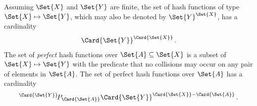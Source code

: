 \documentclass[ ../main.tex]{subfiles}
\begin{document}
Assuming $\Set{X}$ and $\Set{Y}$ are finite, the set of hash functions of type $\Set{X} \mapsto \Set{Y}$, which may also be denoted by $\Set{Y}^{\Set{X}}$, has a cardinality
\begin{equation}
\Card{\Set{Y}}^{\Card{\Set{X}}}\,.
\end{equation}
The set of \emph{perfect} hash functions over $\Set{A} \subseteq \Set{X}$ is a subset of $\Set{X} \mapsto \Set{Y}$ with the predicate that no collisions may occur on any pair of elements in $\Set{A}$.
The set of perfect hash functions over $\Set{A}$ has a cardinality
\begin{equation}
\Perm{\Card{\Set{Y}}}{\Card{\Set{A}}} \Card{\Set{Y}}^{\Card{\Set{X}} - \Card{\Set{A}}}\,.
\end{equation}
\end{document}
